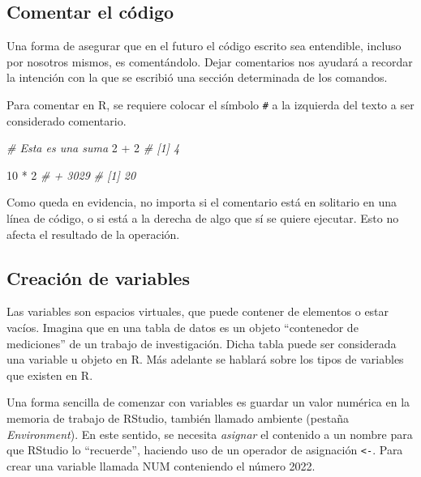 \documentclass[
]{article}
\newenvironment{Shaded}{\begin{snugshade}}{\end{snugshade}}
\newcommand{\CommentTok}[1]{\textcolor[rgb]{0.56,0.35,0.01}{\textit{#1}}}
\newcommand{\DecValTok}[1]{\textcolor[rgb]{0.00,0.00,0.81}{#1}}
\newcommand{\SpecialCharTok}[1]{\textcolor[rgb]{0.00,0.00,0.00}{#1}}
\theoremstyle{definition}
\theoremstyle{definition}
\theoremstyle{definition}
\theoremstyle{definition}
\theoremstyle{remark}
\begin{document}
\hypertarget{comentar-el-cuxf3digo}{%
\subsection{Comentar el código}\label{comentar-el-cuxf3digo}}

Una forma de asegurar que en el futuro el código escrito sea entendible, incluso por nosotros mismos, es comentándolo. Dejar comentarios nos ayudará a recordar la intención con la que se escribió una sección determinada de los comandos.

Para comentar en R, se requiere colocar el símbolo \texttt{\#} a la izquierda del texto a ser considerado comentario.

\begin{Shaded}
\begin{Highlighting}[]
\CommentTok{\# Esta es una suma }
\DecValTok{2} \SpecialCharTok{+} \DecValTok{2} 
\CommentTok{\# [1] 4}

\DecValTok{10} \SpecialCharTok{*} \DecValTok{2} \CommentTok{\# + 3029}
\CommentTok{\# [1] 20}
\end{Highlighting}
\end{Shaded}

Como queda en evidencia, no importa si el comentario está en solitario en una línea de código, o si está a la derecha de algo que sí se quiere ejecutar. Esto no afecta el resultado de la operación.

\hypertarget{creaciuxf3n-de-variables}{%
\subsection{Creación de variables}\label{creaciuxf3n-de-variables}}

Las variables son espacios virtuales, que puede contener de elementos o estar vacíos. Imagina que en una tabla de datos es un objeto ``contenedor de mediciones'' de un trabajo de investigación. Dicha tabla puede ser considerada una variable u objeto en R. Más adelante se hablará sobre los tipos de variables que existen en R.

Una forma sencilla de comenzar con variables es guardar un valor numérica en la memoria de trabajo de RStudio, también llamado ambiente (pestaña \emph{Environment}). En este sentido, se necesita \emph{asignar} el contenido a un nombre para que RStudio lo ``recuerde'', haciendo uso de un operador de asignación \texttt{\textless{}-}. Para crear una variable llamada NUM conteniendo el número 2022.
\end{document}
